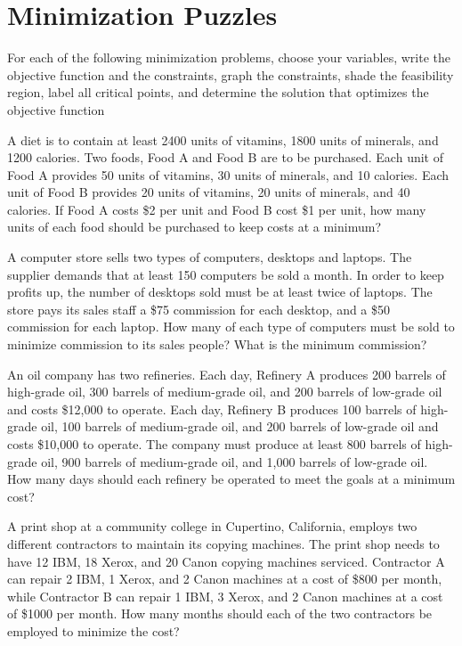 \section{Minimization Puzzles}

For each of the following minimization problems, choose your variables, write the objective function and the
constraints, graph the constraints, shade the feasibility region, label all critical points, and determine the
solution that optimizes the objective function

\begin{puzzle}
    A diet is to contain at least 2400 units of vitamins, 1800 units of minerals, and 1200 calories. Two
    foods, Food A and Food B are to be purchased. Each unit of Food A provides 50 units of vitamins,
    30 units of minerals, and 10 calories. Each unit of Food B provides 20 units of vitamins, 20 units
    of minerals, and 40 calories. If Food A costs \$2 per unit and Food B cost \$1 per unit, how many
    units of each food should be purchased to keep costs at a minimum?
\end{puzzle}

\begin{puzzle}
    A computer store sells two types of computers, desktops and laptops. The supplier demands that
    at least 150 computers be sold a month. In order to keep profits up, the number of desktops sold
    must be at least twice of laptops. The store pays its sales staff a \$75 commission for each desktop,
    and a \$50 commission for each laptop. How many of each type of computers must be sold to
    minimize commission to its sales people? What is the minimum commission?
\end{puzzle}

\begin{puzzle}
    An oil company has two refineries. Each day, Refinery A produces 200 barrels of high-grade oil,
    300 barrels of medium-grade oil, and 200 barrels of low-grade oil and costs \$12,000 to operate.
    Each day, Refinery B produces 100 barrels of high-grade oil, 100 barrels of medium-grade oil, and
    200 barrels of low-grade oil and costs \$10,000 to operate. The company must produce at least 800
    barrels of high-grade oil, 900 barrels of medium-grade oil, and 1,000 barrels of low-grade oil. How
    many days should each refinery be operated to meet the goals at a minimum cost?

\end{puzzle}

\begin{puzzle}
    A print shop at a community college in Cupertino, California, employs two different contractors
    to maintain its copying machines. The print shop needs to have 12 IBM, 18 Xerox, and 20 Canon
    copying machines serviced. Contractor A can repair 2 IBM, 1 Xerox, and 2 Canon machines at a
    cost of \$800 per month, while Contractor B can repair 1 IBM, 3 Xerox, and 2 Canon machines at
    a cost of \$1000 per month. How many months should each of the two contractors be employed to
    minimize the cost?
\end{puzzle}
